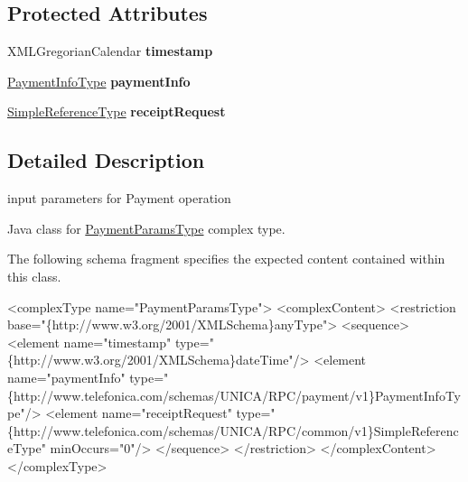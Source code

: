\subsection*{Protected Attributes}
\begin{DoxyCompactItemize}
\item 
\hypertarget{classcom_1_1telefonica_1_1schemas_1_1unica_1_1rpc_1_1payment_1_1v1_1_1PaymentParamsType_aa6dd1ec8eb05e99cd90b7ed800968989}{
XMLGregorianCalendar {\bfseries timestamp}}
\label{classcom_1_1telefonica_1_1schemas_1_1unica_1_1rpc_1_1payment_1_1v1_1_1PaymentParamsType_aa6dd1ec8eb05e99cd90b7ed800968989}

\item 
\hypertarget{classcom_1_1telefonica_1_1schemas_1_1unica_1_1rpc_1_1payment_1_1v1_1_1PaymentParamsType_a3c410aff4f65995bdff26762d3be6ad6}{
\hyperlink{classcom_1_1telefonica_1_1schemas_1_1unica_1_1rpc_1_1payment_1_1v1_1_1PaymentInfoType}{PaymentInfoType} {\bfseries paymentInfo}}
\label{classcom_1_1telefonica_1_1schemas_1_1unica_1_1rpc_1_1payment_1_1v1_1_1PaymentParamsType_a3c410aff4f65995bdff26762d3be6ad6}

\item 
\hypertarget{classcom_1_1telefonica_1_1schemas_1_1unica_1_1rpc_1_1payment_1_1v1_1_1PaymentParamsType_a0b2cda82cb34e1b688c908aa256e2db4}{
\hyperlink{classcom_1_1telefonica_1_1schemas_1_1unica_1_1rpc_1_1common_1_1v1_1_1SimpleReferenceType}{SimpleReferenceType} {\bfseries receiptRequest}}
\label{classcom_1_1telefonica_1_1schemas_1_1unica_1_1rpc_1_1payment_1_1v1_1_1PaymentParamsType_a0b2cda82cb34e1b688c908aa256e2db4}

\end{DoxyCompactItemize}


\subsection{Detailed Description}
input parameters for Payment operation

Java class for \hyperlink{classcom_1_1telefonica_1_1schemas_1_1unica_1_1rpc_1_1payment_1_1v1_1_1PaymentParamsType}{PaymentParamsType} complex type.

The following schema fragment specifies the expected content contained within this class.


\begin{DoxyPre}
 <complexType name="PaymentParamsType">
   <complexContent>
     <restriction base="\{http://www.w3.org/2001/XMLSchema\}anyType">
       <sequence>
         <element name="timestamp" type="\{http://www.w3.org/2001/XMLSchema\}dateTime"/>
         <element name="paymentInfo" type="\{http://www.telefonica.com/schemas/UNICA/RPC/payment/v1\}PaymentInfoType"/>
         <element name="receiptRequest" type="\{http://www.telefonica.com/schemas/UNICA/RPC/common/v1\}SimpleReferenceType" minOccurs="0"/>
       </sequence>
     </restriction>
   </complexContent>
 </complexType>
 \end{DoxyPre}
 

